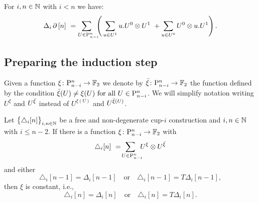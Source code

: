\begin{proposition} \label{p:from the other paper}
	For $i,n \in \mathbb{N}$ with $i < n$ we have:
	\[
	\Delta_i \operatorname{\partial} \, [n] \ =
	\sum_{U \in \mathrm{P}_{n-i}^n \kern-5pt} \left( \,
	\sum_{u \in U^1} {u.U^0} \otimes {U^1} \ +
	\sum_{u \in U^0} {U^0} \otimes {u.U^1} \right).
	\]
\end{proposition}

\subsection{Preparing the induction step} \label{ss:preparing}

\begin{notation}
	Given a function $\xi \colon \mathrm{P}_{n-i}^n \to {\mathbb{F}_2}$ we denote by ${\bar{\xi}} \colon \mathrm{P}_{n-i}^n \to {\mathbb{F}_2}$ the function defined by the condition ${\bar{\xi}}(U) \neq \xi(U) \text{ for all } U \in \mathrm{P}_{n-i}^n$.
	We will simplify notation writing $U^\xi$ and $U^{{\bar{\xi}}}$ instead of $U^{\xi(U)}$ and $U^{{\bar{\xi}}(U)}$.
\end{notation}

\begin{lemma} \label{l:first nail}
	Let $\big\{ \triangle_i [n] \big\}_{i,n\in\mathbb{N}}$ be a free and non-degenerate \mbox{cup-$i$} construction and $i,n \in \mathbb{N}$ with $i \leq n-2$.
	If there is a function $\xi \colon \mathrm{P}_{n-i}^n \to {\mathbb{F}_2}$ with
	\begin{equation} \label{e:assumed identity with xi and barxi}
	\triangle_i [n] \ = \!
	\sum_{U \in \mathrm{P}_{n-i}^n \kern-5pt} U^{\xi} \otimes U^{{\bar{\xi}}}
	\end{equation}
	and either
	\[
	\triangle_i [n-1] = \Delta_i [n-1]
	\quad \text{or} \quad
	\triangle_i [n-1] = T\Delta_i [n-1],
	\]
	then $\xi$ is constant, i.e.,
	\[
	\triangle_i [n] = \Delta_i [n]
	\quad \text{or} \quad
	\triangle_i [n] = T \Delta_i [n].
	\]
\end{lemma}

